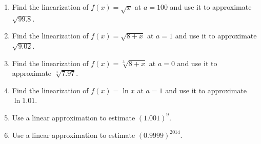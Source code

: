 \begin{enumerate}[ref={\fcProblemRef}]~
\item Find the linearization of $f(x) = \sqrt{x}$ at $a = 100$ and use it to approximate
$\sqrt{99.8}$.



\item Find the linearization of $f(x)=\sqrt{8+x}$ at $a=1$ and use it to approximate $\sqrt{9.02}$.

\item Find the linearization of $f(x)=\sqrt[3]{8+x}$ at $a=0$ and use it to approximate $\sqrt[3] {7.97}$.

\item Find the linearization of $f(x)=\ln x$ at $a=1$ and use it to approximate $\ln 1.01$.

\item Use a linear approximation to estimate $(1.001)^9$. 

\item \label{problem-linearization-estimate0.9999power2014} Use a linear approximation to estimate $(0.9999)^{2014}$. 



\end{enumerate}
